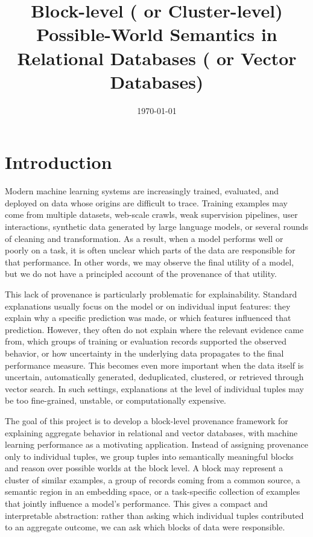 \documentclass[10pt,a4paper]{scrartcl}
\title{Block-level ( or Cluster-level) Possible-World Semantics in Relational Databases ( or Vector Databases)}
\date{\today}
\theoremstyle{definition}
\theoremstyle{remark}
\begin{document}
\maketitle

\section{Introduction}

Modern machine learning systems are increasingly trained, evaluated, 
and deployed on data whose origins are difficult to trace. Training 
examples may come from multiple datasets, web-scale crawls, weak 
supervision pipelines, user interactions, synthetic data generated 
by large language models, or several rounds of cleaning and transformation. 
As a result, when a model performs well or poorly on a task, it is often 
unclear which parts of the data are responsible for that performance. 
In other words, we may observe the final utility of a model, but we do 
not have a principled account of the provenance of that utility.

This lack of provenance is particularly problematic for explainability. 
Standard explanations usually focus on the model or on individual input 
features: they explain why a specific prediction was made, or which features 
influenced that prediction. However, they often do not explain where the 
relevant evidence came from, which groups of training or evaluation records 
supported the observed behavior, or how uncertainty in the underlying data 
propagates to the final performance measure. This becomes even more important 
when the data itself is uncertain, automatically generated, deduplicated, 
clustered, or retrieved through vector search. In such settings, explanations 
at the level of individual tuples may be too fine-grained, unstable, or computationally expensive.

The goal of this project is to develop a block-level provenance framework 
for explaining aggregate behavior in relational and vector databases, with 
machine learning performance as a motivating application. Instead of assigning 
provenance only to individual tuples, we group tuples into semantically 
meaningful blocks and reason over possible worlds at the block level. 
A block may represent a cluster of similar examples, a group of records 
coming from a common source, a semantic region in an embedding space, or 
a task-specific collection of examples that jointly influence a model's 
performance. This gives a compact and interpretable abstraction: rather 
than asking which individual tuples contributed to an aggregate outcome, 
we can ask which blocks of data were responsible.
\end{document}
